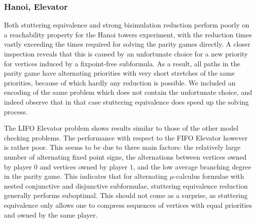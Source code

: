 \documentclass[a4paper]{llncs}
\newcommand{\even}{\ensuremath{0}\xspace}
\newcommand{\odd}{\ensuremath{1}\xspace}
\begin{document}
\subsubsection{Hanoi, Elevator}

Both stuttering equivalence and strong bisimulation reduction perform
poorly on a reachability property for the Hanoi towers experiment, with
the reduction times vastly exceeding the times required for solving the
parity games directly.  A closer inspection reveals that this is caused
by an unfortunate choice for a new priority for vertices induced by a
fixpoint-free subformula.  As a result, all paths in the parity game
have alternating priorities with very short stretches of the same priorities, 
because of which hardly any reduction is possible. We included an encoding of
the same problem which does not contain the unfortunate choice, and indeed
observe that in that case stuttering equivalence does speed up the solving
process.

The LIFO Elevator problem shows results similar to those of the other model 
checking problems. The performance with respect to the FIFO Elevator however is
rather poor. This seems to be due to three main factors: the relatively large 
number of alternating fixed point signs, the alternations between vertices owned
by player $\even$ and vertices owned by player $\odd$, and the low average 
branching degree in the parity game. This indicates that for alternating 
$\mu$-calculus formulae with nested conjunctive and disjunctive subformulae, 
stuttering equivalence reduction generally performs suboptimal. This should not 
come as a surprise, as stuttering equivalence only allows one to compress
sequences of vertices with equal priorities and owned by the same player.
\end{document}
